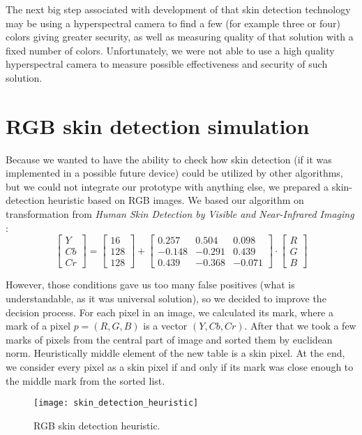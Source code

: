         The next big step associated with development of that skin detection
        technology may be using a hyperspectral camera to find a few (for example three
        or four) colors giving greater security, as well as measuring
        quality of that solution with a fixed number of colors.
        Unfortunately, we were not able to use a high quality hyperspectral camera
        to measure possible effectiveness and security of such solution.

    \section{RGB skin detection simulation}
        Because we wanted to have the ability to check how skin detection
        (if it was implemented in a possible future device) could be utilized
        by other algorithms, but we could not integrate our prototype with
        anything else, we prepared a skin-detection heuristic based on RGB images.
        We based our algorithm on transformation from
        \textit{Human Skin Detection by Visible and Near-Infrared Imaging} \cite{toyotaskin}:
        \[
            \begin{bmatrix}
                Y \\
                Cb \\
                Cr
            \end{bmatrix}
            =
            \begin{bmatrix}
                16\\
                128\\
                128
            \end{bmatrix}
            +
             \begin{bmatrix}
                 0.257  &  0.504        &  0.098 \\
                -0.148  & -0.291        &  0.439 \\
                 0.439  & -0.368        & -0.071
            \end{bmatrix}
            \cdot
             \begin{bmatrix}
                R\\
                G\\
                B
            \end{bmatrix}
        \]

        However, those conditions gave us too many false positives
        (what is understandable, as it was universal solution), so we decided to improve the decision process.
        For each pixel in an image, we calculated its mark, where a mark of a pixel
        $p = (R, G, B)$ is a vector $(Y, Cb, Cr)$.
        After that we took a few marks of pixels from the central part of image and
        sorted them by euclidean norm.
        Heuristically middle element of the new table is a skin pixel.
        At the end, we consider every pixel as a skin pixel if and only if
        its mark was close enough to the middle mark from the sorted list.

        \begin{figure}[H]
            \caption{RGB skin detection heuristic.}
            \centering
            \texttt{[image: skin\_detection\_heuristic]}
            \label{fig:skin_detection_heuristic}
        \end{figure}
